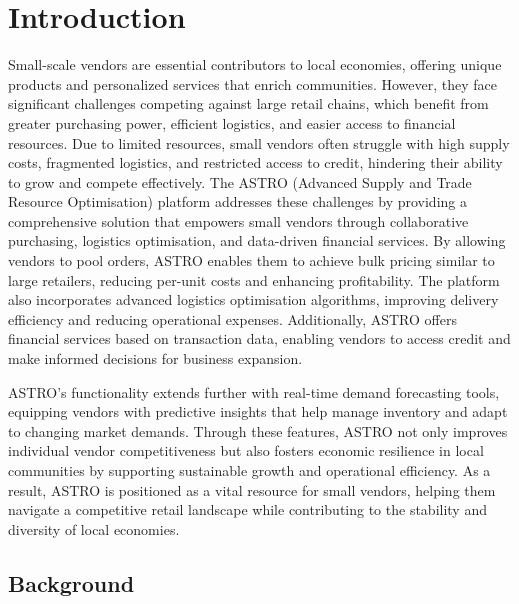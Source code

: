\chapter{Introduction}

Small-scale vendors are essential contributors to local economies, offering unique products and
personalized services that enrich communities. However, they face significant challenges
competing against large retail chains, which benefit from greater purchasing power, efficient
logistics, and easier access to financial resources. Due to limited resources, small vendors often
struggle with high supply costs, fragmented logistics, and restricted access to credit, hindering
their ability to grow and compete effectively.
The ASTRO (Advanced Supply and Trade Resource Optimisation) platform addresses these
challenges by providing a comprehensive solution that empowers small vendors through
collaborative purchasing, logistics optimisation, and data-driven financial services. By allowing
vendors to pool orders, ASTRO enables them to achieve bulk pricing similar to large retailers,
reducing per-unit costs and enhancing profitability. The platform also incorporates advanced
logistics optimisation algorithms, improving delivery efficiency and reducing operational
expenses. Additionally, ASTRO offers financial services based on transaction data, enabling
vendors to access credit and make informed decisions for business expansion.

ASTRO’s functionality extends further with real-time demand forecasting tools, equipping
vendors with predictive insights that help manage inventory and adapt to changing market
demands. Through these features, ASTRO not only improves individual vendor competitiveness
but also fosters economic resilience in local communities by supporting sustainable growth and
operational efficiency. As a result, ASTRO is positioned as a vital resource for small vendors,
helping them navigate a competitive retail landscape while contributing to the stability and
diversity of local economies.
\section{Background}

